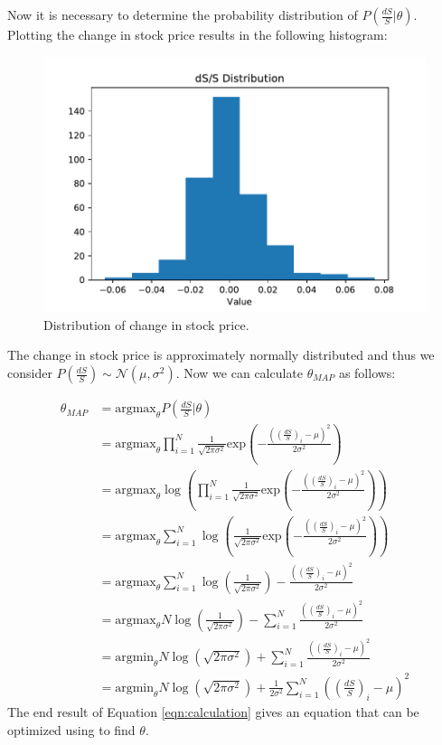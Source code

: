 Now it is necessary to determine the probability distribution of $P(\frac{dS}{S}|\theta)$.
Plotting the change in stock price results in the following histogram:
\begin{figure}
\includegraphics[width=\textwidth]{figures/distribution.pdf}
\caption{Distribution of change in stock price.}
\label{fig:distribution}
\end{figure}
The change in stock price is approximately normally distributed and thus we consider $P(\frac{dS}{S})\sim\mathscr{N}(\mu,\sigma^2)$.
Now we can calculate $\theta_{MAP}$ as follows:

\begin{equation}
\begin{split}
\theta_{MAP}&=\text{argmax}_\theta P(\frac{dS}{S}|\theta)\\
&=\text{argmax}_{\theta}\prod_{i=1}^N\frac{1}{\sqrt{2\pi \sigma^2}}\text{exp}(-\frac{((\frac{dS}{S})_i-\mu)^2}{2\sigma^2})\\
&=\text{argmax}_{\theta}\log(\prod_{i=1}^N\frac{1}{\sqrt{2\pi \sigma^2}}\text{exp}(-\frac{((\frac{dS}{S})_i-\mu)^2}{2\sigma^2}))\\
&=\text{argmax}_{\theta}\sum_{i=1}^N\log(\frac{1}{\sqrt{2\pi \sigma^2}}\text{exp}(-\frac{((\frac{dS}{S})_i-\mu)^2}{2\sigma^2}))\\
&=\text{argmax}_\theta\sum_{i=1}^N\log(\frac{1}{\sqrt{2\pi\sigma^2}})-\frac{((\frac{dS}{S})_i-\mu)^2}{2\sigma^2}\\
&=\text{argmax}_\theta N\log(\frac{1}{\sqrt{2\pi\sigma^2}})-\sum_{i=1}^N\frac{((\frac{dS}{S})_i-\mu)^2}{2\sigma^2}\\
&=\text{argmin}_\theta N\log(\sqrt{2\pi\sigma^2})+\sum_{i=1}^N\frac{((\frac{dS}{S})_i-\mu)^2}{2\sigma^2}\\
&=\text{argmin}_\theta N\log(\sqrt{2\pi\sigma^2})+\frac{1}{2\sigma^2}\sum_{i=1}^N((\frac{dS}{S})_i-\mu)^2
\end{split}
\label{eqn:calculation}
\end{equation}
The end result of Equation \ref{eqn:calculation} gives an equation that can be optimized using  to find $\theta$.

